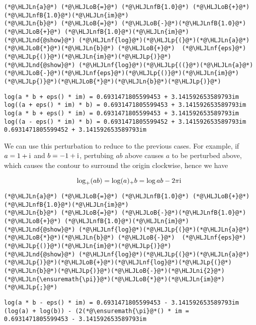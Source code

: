 \documentclass[12pt,landscape]{article}
\newcommand{\HLJLn}[1]{#1}
\newcommand{\HLJLnd}[1]{\textcolor[RGB]{214,102,97}{#1}}
\newcommand{\HLJLnf}[1]{\textcolor[RGB]{66,102,213}{#1}}
\newcommand{\HLJLnfB}[1]{\textcolor[RGB]{59,151,46}{#1}}
\newcommand{\HLJLni}[1]{\textcolor[RGB]{59,151,46}{#1}}
\newcommand{\HLJLoB}[1]{\textcolor[RGB]{102,102,102}{\textbf{#1}}}
\newcommand{\HLJLp}[1]{#1}
\def\I{ {\rm i} }
\begin{document}
{\begin{lstlisting}
(*@\HLJLn{a}@*) (*@\HLJLoB{=}@*) (*@\HLJLnfB{1.0}@*) (*@\HLJLoB{+}@*) (*@\HLJLnfB{1.0}@*)(*@\HLJLn{im}@*)
(*@\HLJLn{b}@*) (*@\HLJLoB{=}@*) (*@\HLJLoB{-}@*)(*@\HLJLnfB{1.0}@*) (*@\HLJLoB{+}@*) (*@\HLJLnfB{1.0}@*)(*@\HLJLn{im}@*)
(*@\HLJLnd{@show}@*) (*@\HLJLnf{log}@*)(*@\HLJLp{(}@*)(*@\HLJLn{a}@*)(*@\HLJLoB{*}@*)(*@\HLJLn{b}@*) (*@\HLJLoB{+}@*)  (*@\HLJLnf{eps}@*)(*@\HLJLp{()}@*)(*@\HLJLn{im}@*)(*@\HLJLp{)}@*)
(*@\HLJLnd{@show}@*) (*@\HLJLnf{log}@*)(*@\HLJLp{((}@*)(*@\HLJLn{a}@*)(*@\HLJLoB{-}@*)(*@\HLJLnf{eps}@*)(*@\HLJLp{()}@*)(*@\HLJLn{im}@*)(*@\HLJLp{)}@*)(*@\HLJLoB{*}@*)(*@\HLJLn{b}@*)(*@\HLJLp{)}@*)
\end{lstlisting}

\begin{lstlisting}
log(a * b + eps() * im) = 0.6931471805599453 + 3.141592653589793im
log((a + eps() * im) * b) = 0.6931471805599453 + 3.141592653589793im
log(a * b + eps() * im) = 0.6931471805599453 + 3.141592653589793im
log((a - eps() * im) * b) = 0.6931471805599452 + 3.141592653589793im
0.6931471805599452 + 3.141592653589793im
\end{lstlisting}


We can use this perturbation to reduce to the previous cases. For example, if $a = 1 + \I$ and $b = -1 + \I$, pertubing $ab$ above causes $a$ to be perturbed  above, which causes the contour to surround the origin clockwise, hence we have

\[
\log_+(ab) = \log(a)_+b = \log a b - 2 \pi \I
\]

\begin{lstlisting}
(*@\HLJLn{a}@*) (*@\HLJLoB{=}@*) (*@\HLJLnfB{1.0}@*) (*@\HLJLoB{+}@*) (*@\HLJLnfB{1.0}@*)(*@\HLJLn{im}@*)
(*@\HLJLn{b}@*) (*@\HLJLoB{=}@*) (*@\HLJLoB{-}@*)(*@\HLJLnfB{1.0}@*) (*@\HLJLoB{+}@*) (*@\HLJLnfB{1.0}@*)(*@\HLJLn{im}@*)
(*@\HLJLnd{@show}@*) (*@\HLJLnf{log}@*)(*@\HLJLp{(}@*)(*@\HLJLn{a}@*)(*@\HLJLoB{*}@*)(*@\HLJLn{b}@*) (*@\HLJLoB{-}@*)  (*@\HLJLnf{eps}@*)(*@\HLJLp{()}@*)(*@\HLJLn{im}@*)(*@\HLJLp{)}@*)
(*@\HLJLnd{@show}@*) (*@\HLJLnf{log}@*)(*@\HLJLp{(}@*)(*@\HLJLn{a}@*)(*@\HLJLp{)}@*)(*@\HLJLoB{+}@*)(*@\HLJLnf{log}@*)(*@\HLJLp{(}@*)(*@\HLJLn{b}@*)(*@\HLJLp{)}@*)(*@\HLJLoB{-}@*)(*@\HLJLni{2}@*)(*@\HLJLn{\ensuremath{\pi}}@*)(*@\HLJLoB{*}@*)(*@\HLJLn{im}@*)(*@\HLJLp{;}@*)
\end{lstlisting}

\begin{lstlisting}
log(a * b - eps() * im) = 0.6931471805599453 - 3.141592653589793im
(log(a) + log(b)) - (2(*@\ensuremath{\pi}@*() * im = 0.6931471805599453 - 3.141592653589793im
\end{lstlisting}


}
\end{document}
